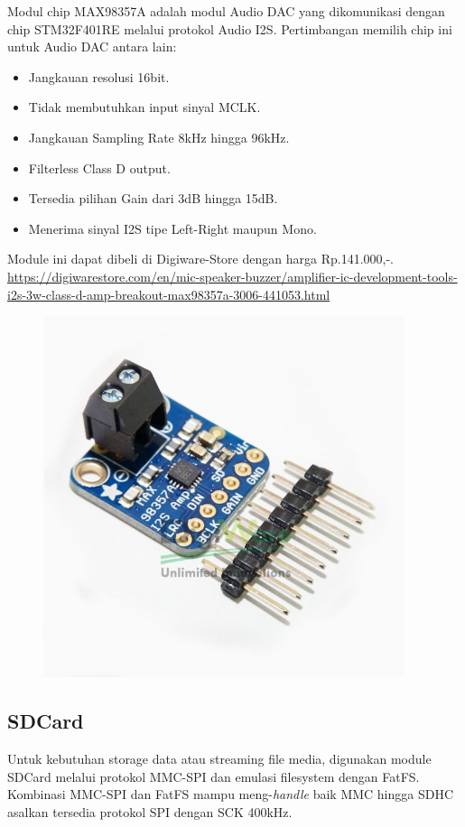 \documentclass[12pt,]{article}
\begin{document}
	Modul chip MAX98357A adalah modul Audio DAC yang dikomunikasi dengan chip STM32F401RE melalui protokol Audio I2S.
	Pertimbangan memilih chip ini untuk Audio DAC antara lain:
	\begin{itemize}
		\item Jangkauan resolusi 16bit.
		\item Tidak membutuhkan input sinyal MCLK.
		\item Jangkauan Sampling Rate 8kHz hingga 96kHz.
		\item Filterless Class D output.
		\item Tersedia pilihan Gain dari 3dB hingga 15dB.
		\item Menerima sinyal I2S tipe Left-Right maupun Mono.
	\end{itemize}

	Module ini dapat dibeli di Digiware-Store dengan harga Rp.141.000,-.\\
	\url{https://digiwarestore.com/en/mic-speaker-buzzer/amplifier-ic-development-tools-i2s-3w-class-d-amp-breakout-max98357a-3006-441053.html}
	
	\begin{figure}[!ht]
		\centering
		\includegraphics[width=300pt]{images/max98357}
	\end{figure}
	
	\newpage
	\subsection{SDCard}
	
	Untuk kebutuhan storage data atau streaming file media, digunakan module SDCard melalui protokol MMC-SPI dan emulasi filesystem dengan FatFS.
	Kombinasi MMC-SPI dan FatFS mampu meng-\textit{handle} baik MMC hingga SDHC asalkan tersedia protokol SPI dengan SCK 400kHz.
	
\end{document}
